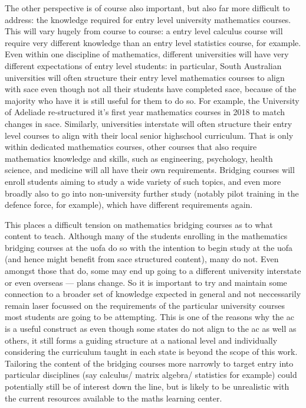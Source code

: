 \documentclass[twoside,12pt,a4paper]{report}
\begin{document}
The other perspective is of course also important, but also far more difficult to address: the knowledge required for entry level university mathematics courses. This will vary hugely from course to course: a entry level calculus course will require very different knowledge than an entry level statistics course, for example. Even within one discipline of mathematics, different universities will have very different expectations of entry level students: in particular, South Australian universities will often structure their entry level mathematics courses to align with \gls{sace} even though not all their students have completed \gls{sace}, because of the majority who have it is still useful for them to do so. For example, the University of Adeliade re-structured it's first year mathematics courses in 2018 to match changes in \gls{sace}. Similarly, universities interstate will often structure their entry level courses to align with their local senior highschool curriculum. That is only within dedicated mathematics courses, other courses that also require mathematics knowledge and skills, such as engineering, psychology, health science, and medicine will all have their own requirements. Bridging courses will enroll students aiming to study a wide variety of such topics, and even more broadly also to go into non-university further study (notably pilot training in the defence force, for example), which have different requirements again.

This places a difficult tension on mathematics bridging courses as to what content to teach. Although many of the students enrolling in the mathematics bridging courses at the \gls{uofa} do so with the intention to begin study at the \gls{uofa} (and hence might benefit from \gls{sace} structured content), many do not. Even amongst those that do, some may end up going to a different university interstate or even overseas --- plans change. So it is important to try and maintain some connection to a broader set of knowledge expected in general and not neccessarily remain laser focussed on the requirements of the particular university courses most students are going to be attempting. This is one of the reasons why the \gls{ac} is a useful construct as even though some states do not align to the \gls{ac} as well as others, it still forms a guiding structure at a national level and individually considering the curriculum taught in each state is beyond the scope of this work. Tailoring the content of the bridging courses more narrowly to target entry into particular disciplines (say calculus/ matrix algebra/ statistics for example) could potentially still be of interest down the line, but is likely to be unrealistic with the current resources available to the maths learning center.
\end{document}
